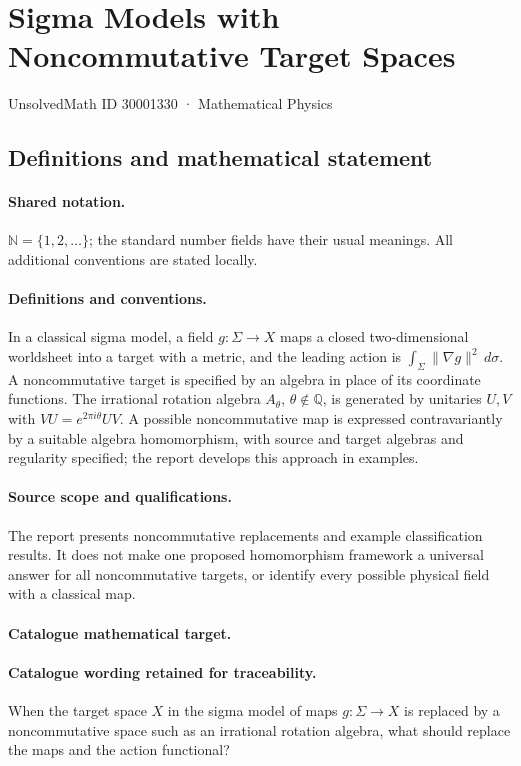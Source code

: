 \documentclass[11pt]{article}
\begin{document}
\setcounter{section}{30001329}
\section{Sigma Models with Noncommutative Target Spaces}\label{30001330}
{\small UnsolvedMath ID 30001330 · Mathematical Physics}
\subsection{Definitions and mathematical statement}

\paragraph{Shared notation.}$\mathbb N=\{1,2,\ldots\}$; the standard number fields have their usual meanings. All additional conventions are stated locally.


\paragraph{Definitions and conventions.} In a classical sigma model, a field $g:\Sigma\to X$ maps a closed two-dimensional worldsheet into a target with a metric, and the leading action is $\int_\Sigma\|\nabla g\|^2\,d\sigma$. A noncommutative target is specified by an algebra in place of its coordinate functions. The irrational rotation algebra $A_\theta$, $\theta\notin\mathbb Q$, is generated by unitaries $U,V$ with $VU=e^{2\pi i\theta}UV$. A possible noncommutative map is expressed contravariantly by a suitable algebra homomorphism, with source and target algebras and regularity specified; the report develops this approach in examples.

\paragraph{Source scope and qualifications.} The report presents noncommutative replacements and example classification results. It does not make one proposed homomorphism framework a universal answer for all noncommutative targets, or identify every possible physical field with a classical map.

\paragraph{Catalogue mathematical target.}
\paragraph{Catalogue wording retained for traceability.}
When the target space $X$ in the sigma model of maps $g:\Sigma\to X$ is replaced by a noncommutative space such as an irrational rotation algebra, what should replace the maps and the action functional?
\end{document}
